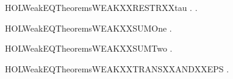 \begin{SaveVerbatim}{HOLWeakEQTheoremsWEAKXXRESTRXXtau}
\HOLTokenTurnstile{} \HOLSymConst{\HOLTokenForall{}} .  \HOLTokenWeakTransBegin\HOLConst{\ensuremath{\tau}}\HOLTokenWeakTransEnd {} \HOLSymConst{\HOLTokenImp{}} \HOLSymConst{\HOLTokenForall{}}. \HOLConst{\ensuremath{\nu}}   \HOLTokenWeakTransBegin\HOLConst{\ensuremath{\tau}}\HOLTokenWeakTransEnd \HOLConst{\ensuremath{\nu}}  
\end{SaveVerbatim}
\newcommand{\HOLWeakEQTheoremsWEAKXXRESTRXXtau}{\UseVerbatim{HOLWeakEQTheoremsWEAKXXRESTRXXtau}}
\begin{SaveVerbatim}{HOLWeakEQTheoremsWEAKXXSUMOne}
\HOLTokenTurnstile{} \HOLSymConst{\HOLTokenForall{}}   .  \HOLTokenWeakTransBegin{}\HOLTokenWeakTransEnd {} \HOLSymConst{\HOLTokenImp{}}  \HOLSymConst{\ensuremath{+}}  \HOLTokenWeakTransBegin{}\HOLTokenWeakTransEnd {}
\end{SaveVerbatim}
\newcommand{\HOLWeakEQTheoremsWEAKXXSUMOne}{\UseVerbatim{HOLWeakEQTheoremsWEAKXXSUMOne}}
\begin{SaveVerbatim}{HOLWeakEQTheoremsWEAKXXSUMTwo}
\HOLTokenTurnstile{} \HOLSymConst{\HOLTokenForall{}}   .  \HOLTokenWeakTransBegin{}\HOLTokenWeakTransEnd {} \HOLSymConst{\HOLTokenImp{}}  \HOLSymConst{\ensuremath{+}}  \HOLTokenWeakTransBegin{}\HOLTokenWeakTransEnd {}
\end{SaveVerbatim}
\newcommand{\HOLWeakEQTheoremsWEAKXXSUMTwo}{\UseVerbatim{HOLWeakEQTheoremsWEAKXXSUMTwo}}
\begin{SaveVerbatim}{HOLWeakEQTheoremsWEAKXXTRANSXXANDXXEPS}
\HOLTokenTurnstile{} \HOLSymConst{\HOLTokenForall{}}   .  \HOLTokenWeakTransBegin{}\HOLTokenWeakTransEnd {} \HOLSymConst{\HOLTokenConj{}}    \HOLSymConst{\HOLTokenImp{}}  \HOLTokenWeakTransBegin{}\HOLTokenWeakTransEnd {}
\end{SaveVerbatim}
